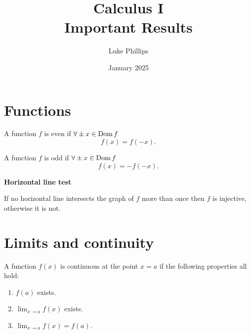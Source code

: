 \documentclass[10pt, a4paper]{article}
\title{Calculus I \\
    \large Important Results}
\author{Luke Phillips}
\date{January 2025}
\begin{document}
\maketitle

\newpage

\tableofcontents

\newpage

\section{Functions}

\begin{definition}
    A function $f$ is even if $\forall \pm x \in \operatorname{Dom}{f}$
    \[
    f(x) = f(-x).
    \]
\end{definition}

\begin{definition}
    A function $f$ is odd if $\forall \pm x \in \operatorname{Dom}{f}$
    \[
    f(x) = -f(-x).
    \]
\end{definition}

\begin{center}
\end{center}
\hfill

\textbf{Horizontal line test}

If no horizontal line intersects the graph of $f$ more than once then $f$ is injective,
otherwise it is not.

\newpage

\section{Limits and continuity}

\begin{definition}
    A function $f(x)$ is continuous at the point $x = a$ if the following properties all hold:
    \begin{enumerate}[label = (\roman*)]
        \item $f(a)$ exists.
        
        \item $\lim_{x \rightarrow a}f(x)$ exists.
        
        \item $\lim_{x \rightarrow a}f(x) = f(a)$.
    \end{enumerate}
\end{definition}
\end{document}
